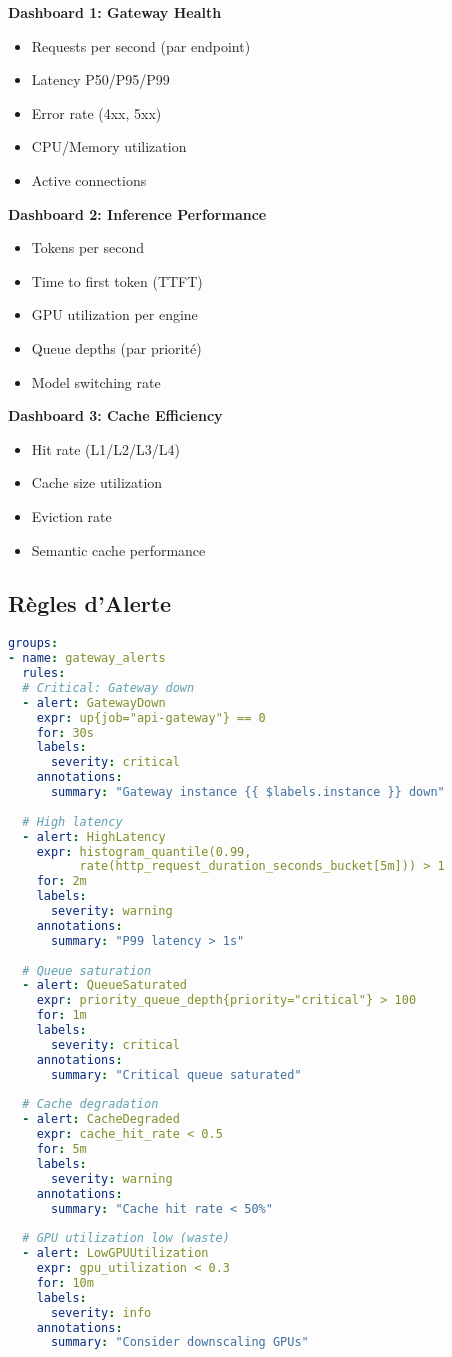 \documentclass[12pt,a4paper]{article}
\begin{document}
\textbf{Dashboard 1: Gateway Health}
\begin{itemize}[noitemsep]
    \item Requests per second (par endpoint)
    \item Latency P50/P95/P99
    \item Error rate (4xx, 5xx)
    \item CPU/Memory utilization
    \item Active connections
\end{itemize}

\textbf{Dashboard 2: Inference Performance}
\begin{itemize}[noitemsep]
    \item Tokens per second
    \item Time to first token (TTFT)
    \item GPU utilization per engine
    \item Queue depths (par priorité)
    \item Model switching rate
\end{itemize}

\textbf{Dashboard 3: Cache Efficiency}
\begin{itemize}[noitemsep]
    \item Hit rate (L1/L2/L3/L4)
    \item Cache size utilization
    \item Eviction rate
    \item Semantic cache performance
\end{itemize}

\subsection{Règles d'Alerte}

\begin{lstlisting}[language=yaml, caption=Prometheus Alert Rules]
groups:
- name: gateway_alerts
  rules:
  # Critical: Gateway down
  - alert: GatewayDown
    expr: up{job="api-gateway"} == 0
    for: 30s
    labels:
      severity: critical
    annotations:
      summary: "Gateway instance {{ $labels.instance }} down"
  
  # High latency
  - alert: HighLatency
    expr: histogram_quantile(0.99, 
          rate(http_request_duration_seconds_bucket[5m])) > 1
    for: 2m
    labels:
      severity: warning
    annotations:
      summary: "P99 latency > 1s"
  
  # Queue saturation
  - alert: QueueSaturated
    expr: priority_queue_depth{priority="critical"} > 100
    for: 1m
    labels:
      severity: critical
    annotations:
      summary: "Critical queue saturated"
  
  # Cache degradation
  - alert: CacheDegraded
    expr: cache_hit_rate < 0.5
    for: 5m
    labels:
      severity: warning
    annotations:
      summary: "Cache hit rate < 50%"
  
  # GPU utilization low (waste)
  - alert: LowGPUUtilization
    expr: gpu_utilization < 0.3
    for: 10m
    labels:
      severity: info
    annotations:
      summary: "Consider downscaling GPUs"
\end{lstlisting}
\end{document}
